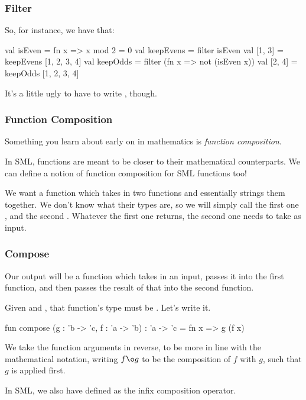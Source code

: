 \documentclass[aspectratio=169]{beamer}
\begin{document}
\begin{frame}[fragile]
  \frametitle{Filter}

  So, for instance, we have that:

  \begin{codeblock}
    val isEven = fn x => x mod 2 = 0
    val keepEvens = filter isEven 
    val [1, 3] = keepEvens [1, 2, 3, 4] 
    val keepOdds = filter (fn x => not (isEven x))
    val [2, 4] = keepOdds [1, 2, 3, 4]
  \end{codeblock}

  It's a little ugly to have to write , though.
\end{frame}

\begin{frame}[fragile]
  \frametitle{Function Composition}

  Something you learn about early on in mathematics is \textit{function composition}.

  In SML, functions are meant to be closer to their mathematical counterparts. We
  can define a notion of function composition for SML functions too!

  We want a function which takes in two functions and essentially strings them
  together. We don't know what their types are, so we will simply call the first
  one , and the second . Whatever the first one 
  returns, the second one needs to take as input.
\end{frame}

\begin{frame}[fragile]
  \frametitle{Compose}

  Our output will be a function which takes in an input, passes it into the
  first function, and then passes the result of that into the second function.

  Given  and , that function's type must be
  . Let's write it.

  \begin{codeblock}
    fun compose (g : 'b -> 'c, f : 'a -> 'b) : 'a -> 'c =
      fn x => g (f x)
  \end{codeblock}

  We take the function arguments in reverse, to be more in line with the
  mathematical notation, writing $f \o g$ to be the composition of $f$
  with $g$, such that $g$ is applied first.

  In SML, we also have  defined as the infix composition operator.  
\end{frame}
\end{document}
